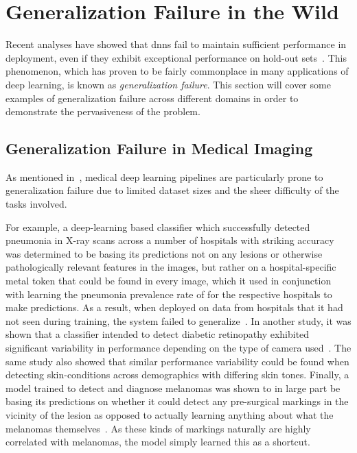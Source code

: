 \section{Generalization Failure in the Wild} \label{case_studies}
    Recent analyses have showed that \glspl{dnn} fail to maintain sufficient performance in deployment, even if they exhibit exceptional performance on hold-out sets~\cite{damour2020underspecification, endocv2021, shortcut_learning}. This phenomenon, which has proven to be fairly commonplace in many applications of deep learning, is known as \textit{generalization failure}. This section will cover some examples of generalization failure across different domains in order to demonstrate the pervasiveness of the problem.
    
	\subsection{Generalization Failure in Medical Imaging} \label{gen_failure_med}
	As mentioned in~, medical deep learning pipelines are particularly prone to generalization failure due to limited dataset sizes and the sheer difficulty of the tasks involved.
	
	For example, a deep-learning based classifier which successfully detected pneumonia in X-ray scans across a number of hospitals with striking accuracy was determined to be basing its predictions not on any lesions or otherwise pathologically relevant features in the images, but rather on a hospital-specific metal token that could be found in every image, which it used in conjunction with learning the pneumonia prevalence rate of for the respective hospitals to make predictions. As a result, when deployed on data from hospitals that it had not seen during training, the system failed to generalize~\cite{pneumonia}. In another study, it was shown that a classifier intended to detect diabetic retinopathy exhibited significant variability in performance depending on the type of camera used~\cite{damour2020underspecification}. The same study also showed that similar performance variability could be found when detecting skin-conditions across demographics with differing skin tones. Finally, a model trained to detect and diagnose melanomas  was shown to in large part be basing its predictions on whether it could detect any pre-surgical markings in the vicinity of the lesion as opposed to actually learning anything about what the melanomas themselves~\cite{skin_shortcut}. As these kinds of markings naturally are highly correlated with melanomas, the model simply learned this as a shortcut. 
	
